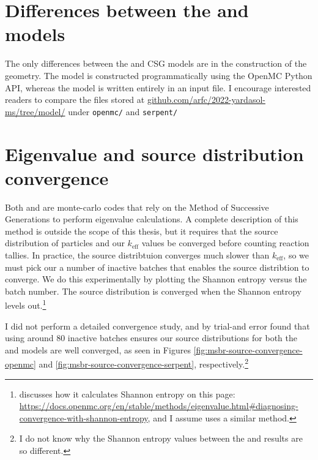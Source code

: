 \section{Differences between the \OpenMC and \SerpentTWO models}
The only differences between the \OpenMC and \SerpentTWO CSG models are in the
construction of the geometry. The \OpenMC model is constructed programmatically
using the OpenMC Python API, whereas the \SerpentTWO model is written entirely
in an input file. I encourage interested readers to compare the files stored at
\url{github.com/arfc/2022-yardasol-ms/tree/model/} under \verb.openmc/. and
\verb.serpent/.

\section{Eigenvalue and source distribution convergence}
Both \SerpentTWO and \OpenMC are monte-carlo codes that rely on the Method of
Successive Generations to perform eigenvalue calculations. A complete
description of this method is outside the scope of this thesis, but it requires
that the source distribution of particles and our $k_{\text{eff}}$ values
be converged before counting reaction tallies. In practice, the source
distribtuion converges much slower than $k_{\text{eff}}$, so we must pick our
a number of inactive batches that enables the source distribtion to
converge. We do this experimentally by plotting the Shannon entropy
versus the batch number. The source distribution is converged when the 
Shannon entropy levels out.\footnote{\OpenMC discusses how it calculates Shannon entropy
on this page: \url{https://docs.openmc.org/en/stable/methods/eigenvalue.html\#diagnosing-convergence-with-shannon-entropy},
and I assume \SerpentTWO uses a similar method.}

I did not perform a detailed convergence study, and by trial-and error found
that using around 80 inactive batches ensures our source distributions for both
the \OpenMC and \SerpentTWO models are well converged, as seen in Figures
\ref{fig:msbr-source-convergence-openmc} and \ref{fig:msbr-source-convergence-serpent},
respectively.\footnote{I do not know why the Shannon entropy values between the
\SerpentTWO and \OpenMC results are so different.}

